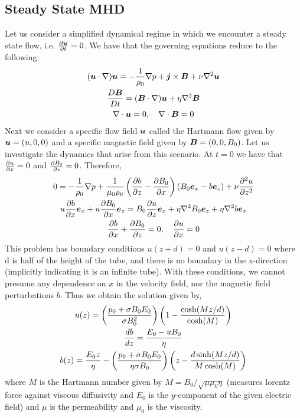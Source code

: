 \documentclass{article}
\begin{document}
\subsection{Steady State MHD}
    Let us consider a simplified dynamical regime in which we encounter a steady
    state flow, i.e. $\frac{\partial \boldsymbol{u}}{\partial t} = 0$. We have that the governing equations
    reduce to the following:
\begin{gather*}
    (\boldsymbol{u}\cdot\nabla)\boldsymbol{u} = -\frac{1}{\rho_0}\nabla p + \boldsymbol{j}\times\boldsymbol{B} + \nu\nabla^2\boldsymbol{u}\\
    \frac{D \boldsymbol{B}}{D t} = (\boldsymbol{B}\cdot\nabla)\boldsymbol{u} + \eta\nabla^2\boldsymbol{B}\\
    \nabla\cdot\boldsymbol{u} = 0, \quad \nabla \cdot{\boldsymbol{B}} = 0
\end{gather*}
Next we consider a specific flow field $\boldsymbol{u}$ called the Hartmann flow given by
$\boldsymbol{u} = \left(u, 0, 0\right)$ and a specific magnetic field given by $\boldsymbol{B} = (0,
0, B_0)$. Let us investigate the dynamics that arise from this scenario.
At $t = 0$ we have that $\frac{\partial u}{\partial x} = 0$ and $\frac{\partial B_0}{\partial z} = 0$. Therefore, 
\begin{gather*}
    0 = -\frac{1}{\rho_0}\nabla p + \frac{1}{\mu_0\rho_0}\left(\frac{\partial b}{\partial z} - \frac{\partial B_0}{\partial x}\right)\left(B_0\boldsymbol{e}_x
    - b\boldsymbol{e}_z\right)+ \nu\frac{\partial^2 u}{\partial z^2}\\
    u\frac{\partial b}{\partial x}\boldsymbol{e}_x + u\frac{\partial B_0}{\partial x}\boldsymbol{e}_z = B_0\frac{\partial u}{\partial z}\boldsymbol{e}_x + \eta\nabla^2B_0\boldsymbol{e}_z  +
    \eta\nabla^2b\boldsymbol{e}_x\\
    \frac{\partial b}{\partial x} + \frac{\partial B_0}{\partial z} = 0,\quad  \frac{\partial u}{\partial x} = 0
\end{gather*}
This problem has boundary conditions $u(z+d) = 0$ and $u(z-d) = 0$ where d
is half of the height of the tube, and there is no boundary in the x-direction
(implicitly indicating it is an infinite tube). With these conditions, we cannot
presume any dependence on $x$ in the velocity field, nor the magnetic field
perturbations $b$. Thus we obtain the solution given by, 
\begin{gather*}
    u(z) = \left(\frac{p_0 + \sigma B_0E_0}{\sigma B_0^2}\right)\left(1 -
    \frac{\cosh(Mz/d)}{\cosh(M)}\right)\\
    \frac{d b}{d z} = \frac{E_0 - uB_0}{\eta} \\
    b(z) = \frac{E_0z}{\eta} - \left(\frac{p_0 + \sigma B_0E_0}{\eta\sigma
    B_0}\right)\left(z -
    \frac{d\sinh(Mz/d)}{M\cosh(M)}\right)
\end{gather*}
where $M$ is the Hartmann number given by $M = B_0/\sqrt{\mu\mu_0\eta}$ (measures
lorentz force against viscous diffusivity and $E_0$ is the $y$-component of
the given electric field) and $\mu$ is the permeability and $\mu_0$ is the
viscosity. 
\end{document}
